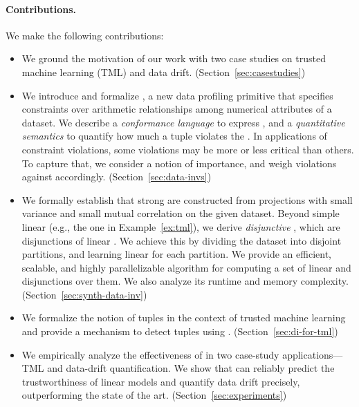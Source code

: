 \paragraph{Contributions.} We make the following contributions:

\begin{itemize}

     \item We ground the motivation of our work with two case studies on trusted
     machine learning (TML) and data drift. (Section~\ref{sec:casestudies})
     
     \item We introduce and formalize \dis, a new data profiling primitive that
     specifies constraints over arithmetic relationships among numerical
     attributes of a dataset. We describe a \emph{conformance language} to
     express \dis, and a \emph{quantitative semantics} to quantify how much a
     tuple violates the \dis. In applications of constraint violations, some
     violations may be more or less critical than others. To capture that, we
     consider a notion of \invariant importance, and weigh violations against
     \invariants accordingly. (Section~\ref{sec:data-invs})
      
     \item We formally establish that strong \dis are constructed from
     projections with small variance and small mutual correlation on the given
     dataset. Beyond simple linear \invariants (e.g., the one in
     Example~\ref{ex:tml}), we derive \emph{disjunctive} \invariants, which are
     disjunctions of linear \invariants. We achieve this by dividing the
     dataset into disjoint partitions, and learning linear \invariants for each
     partition. We provide an efficient, scalable, and highly parallelizable
     algorithm for computing a set of linear \dis and disjunctions over them.
     We also analyze its runtime and memory complexity.
     (Section~\ref{sec:synth-data-inv})
     
     \item We formalize the notion of \emph{\nc} tuples in the context of
     trusted machine learning and provide a mechanism to detect \nc tuples
     using \dis. (Section~\ref{sec:di-for-tml})
	 
     \item We empirically analyze the effectiveness of \dis in two case-study
     applications---TML and data-drift quantification. We show that \dis can
     reliably predict the trustworthiness of linear models and quantify data
     drift precisely, outperforming the state of the art.
     (Section~\ref{sec:experiments})
	 
  \end{itemize}